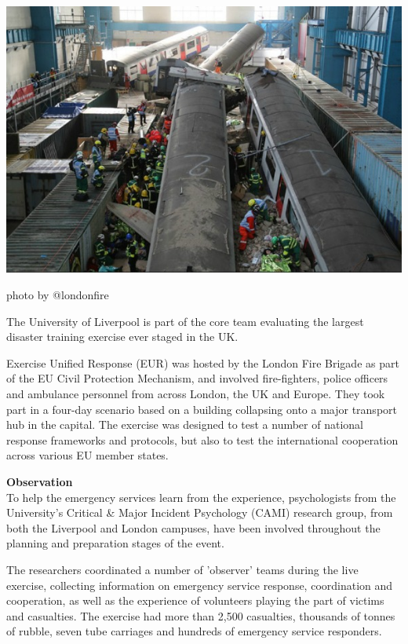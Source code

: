 \documentclass[11pt]{article}%
\begin{document}
\begin{minipage}{.75\linewidth}
\begin{center}
\includegraphics[width=0.98 \textwidth]{lauren/trainDerail.jpg}
\end{center}
{\scriptsize photo by @londonfire}
\begin{multicols}{2}

The University of Liverpool is part of the core team evaluating the largest disaster training exercise ever staged in the UK.

Exercise Unified Response (EUR) was hosted by the London Fire Brigade as part of the EU Civil Protection Mechanism, and involved fire-fighters, police officers and ambulance personnel from across London, the UK and Europe. They took part in a four-day scenario based on a building collapsing onto a major transport hub in the capital. The exercise was designed to test a number of national response frameworks and protocols, but also to test the international cooperation across various EU member states.

\textbf{Observation}\\
To help the emergency services learn from the experience, psychologists from the University’s Critical & Major Incident Psychology (CAMI) research group, from both the Liverpool and London campuses, have been involved throughout the planning and preparation stages of the event. 

The researchers coordinated a number of ’observer’ teams during the live exercise, collecting information on emergency service response, coordination and cooperation, as well as the experience of volunteers playing the part of victims and casualties. The exercise had more than 2,500 casualties, thousands of tonnes of rubble, seven tube carriages and hundreds of emergency service responders.


\end{multicols}
\end{minipage}
\end{document}
